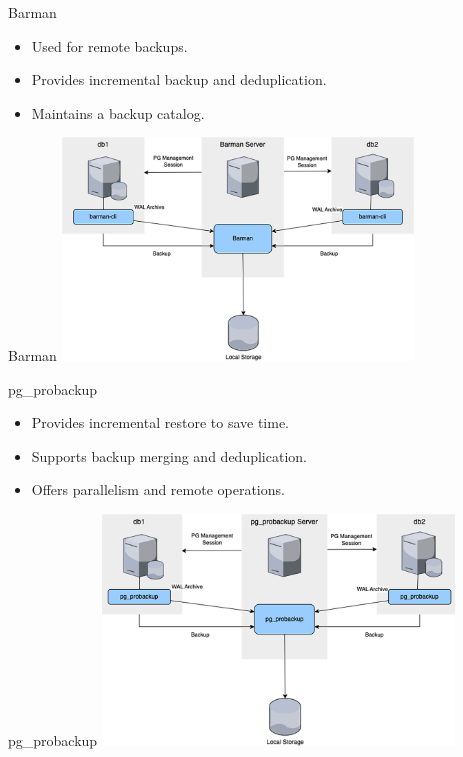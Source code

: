 \documentclass[aspectratio=169]{beamer}
\begin{document}
\begin{frame}{Barman}
    \begin{itemize}
        \item Used for remote backups.
        \item Provides incremental backup and deduplication.
        \item Maintains a backup catalog.
    \end{itemize}
\end{frame}

\begin{frame}{Barman}
    \centering
    \includegraphics[width=0.7\textwidth]{figures/barman}
\end{frame}

\begin{frame}{pg\_probackup}
    \begin{itemize}
        \item Provides incremental restore to save time.
        \item Supports backup merging and deduplication.
        \item Offers parallelism and remote operations.
    \end{itemize}
\end{frame}

\begin{frame}{pg\_probackup}
    \centering
    \includegraphics[width=0.7\textwidth]{figures/pg_probackup}
\end{frame}
\end{document}
